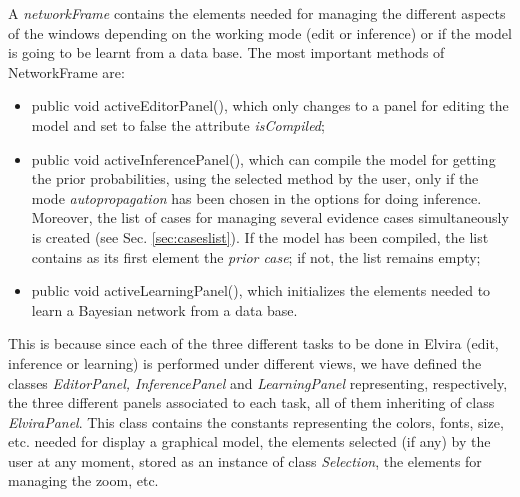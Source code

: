 A \emph{networkFrame} contains the elements needed for managing
the different aspects of the windows depending on the working mode
(edit or inference) or if the model is going to be learnt from a
data base. The most important methods of NetworkFrame are:
\begin{itemize}
  \item public void activeEditorPanel(), which only changes to a panel for
editing the model and set to false the attribute
\emph{isCompiled};
  \item public void activeInferencePanel(), which can compile the
model for getting the prior probabilities, using the selected
method by the user, only if the mode \emph{autopropagation} has
been chosen in the options for doing inference. Moreover, the list
of cases for managing several evidence cases simultaneously is
created (see Sec. \ref{sec:caseslist}). If the model has been
compiled, the list contains as its first element the \emph{prior
case}; if not, the list remains empty;
  \item public void activeLearningPanel(), which initializes the elements needed to learn a Bayesian network from a data
base.
\end{itemize}

This is because since each of the three different tasks to be done
in Elvira (edit, inference or learning) is performed under
different views, we have defined the classes \emph{EditorPanel,
InferencePanel} and \emph{LearningPanel} representing,
respectively, the three different panels associated to each task,
all of them inheriting of class \emph{ElviraPanel}. This class
contains the constants representing the colors, fonts, size, etc.
needed for display a graphical model, the elements selected (if
any) by the user at any moment, stored as an instance of class
\emph{Selection}, the
elements for managing the zoom, etc.\\

